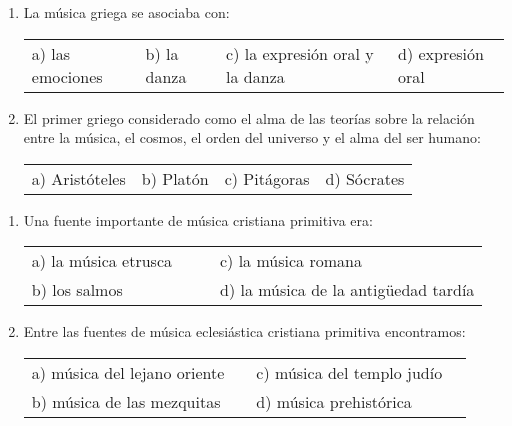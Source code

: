 \documentclass[letterpaper,12pt,notitlepage,spanish]{article}
\begin{document}
%
%
\begin{ejercicio}
	\begin{enumerate}
%
%
	\item La música griega se asociaba con: \par
%		
	\begin{tabular}{llll}
		a) las emociones & b) la danza & c) la expresión oral y la danza & d) expresión oral\\
	\end{tabular}
%
%
%
%
		\item El primer griego considerado como el alma de las teorías sobre la relación entre la música, el cosmos, el orden del universo y el alma del ser humano: \par
%		
	\begin{tabular}{llll}
		a) Aristóteles & b) Platón & c) Pitágoras  & d) Sócrates\\
	\end{tabular}

%
%
	\end{enumerate}
\end{ejercicio}
%
%
\begin{ejercicio}
	\begin{enumerate}
%
		\item Una fuente importante de música cristiana primitiva era: \par
%		
	\begin{tabular}{llll}
		a) la música etrusca &  &  & c) la música romana \\
		b) los salmos &  &  & d) la música de la antigüedad tardía
	\end{tabular}

%
%
%
%
	\item Entre las fuentes de música eclesiástica cristiana primitiva encontramos: \par
%
%		
	\begin{tabular}{llll}
		a) música del lejano oriente &  & c) música del templo judío &  \\
		b) música de las mezquitas & & d) música prehistórica \\
	\end{tabular}

%
%
	\end{enumerate}
\end{ejercicio}
\end{document}
